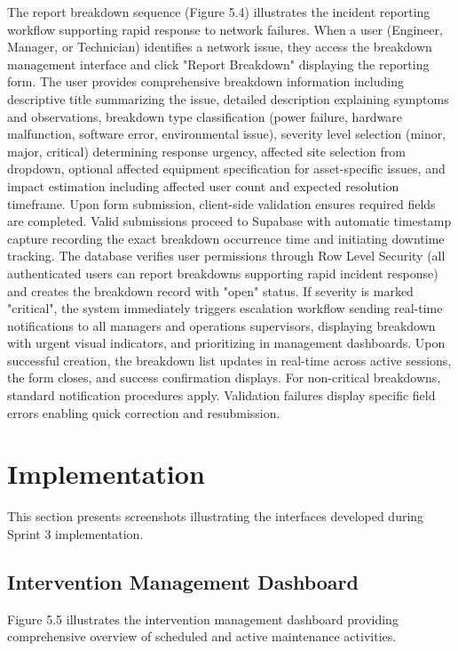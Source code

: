 The report breakdown sequence (Figure 5.4) illustrates the incident reporting workflow supporting rapid response to network failures. When a user (Engineer, Manager, or Technician) identifies a network issue, they access the breakdown management interface and click "Report Breakdown" displaying the reporting form. The user provides comprehensive breakdown information including descriptive title summarizing the issue, detailed description explaining symptoms and observations, breakdown type classification (power failure, hardware malfunction, software error, environmental issue), severity level selection (minor, major, critical) determining response urgency, affected site selection from dropdown, optional affected equipment specification for asset-specific issues, and impact estimation including affected user count and expected resolution timeframe. Upon form submission, client-side validation ensures required fields are completed. Valid submissions proceed to Supabase with automatic timestamp capture recording the exact breakdown occurrence time and initiating downtime tracking. The database verifies user permissions through Row Level Security (all authenticated users can report breakdowns supporting rapid incident response) and creates the breakdown record with "open" status. If severity is marked "critical", the system immediately triggers escalation workflow sending real-time notifications to all managers and operations supervisors, displaying breakdown with urgent visual indicators, and prioritizing in management dashboards. Upon successful creation, the breakdown list updates in real-time across active sessions, the form closes, and success confirmation displays. For non-critical breakdowns, standard notification procedures apply. Validation failures display specific field errors enabling quick correction and resubmission.

\section{Implementation}

This section presents screenshots illustrating the interfaces developed during Sprint 3 implementation.

\subsection{Intervention Management Dashboard}

Figure 5.5 illustrates the intervention management dashboard providing comprehensive overview of scheduled and active maintenance activities.

